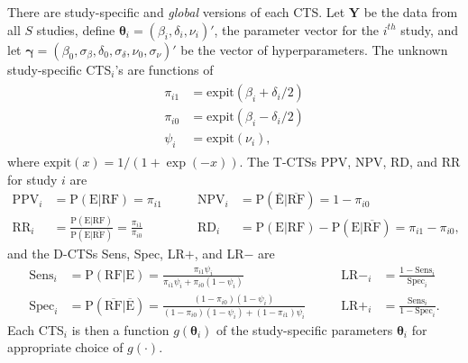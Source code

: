 \documentclass[AMA,STIX1COL]{WileyNJD-v2}
\newcommand{\E}{\mbox{E}}
\newcommand{\RF}{\mbox{RF}}
\newcommand{\Ebar}{\overline{\mbox{E}}}
\newcommand{\RFbar}{\overline{\mbox{RF}}}
\newcommand{\boldtheta}{\boldsymbol{\theta}}
\newcommand{\boldgamma}{\boldsymbol{\gamma}}
\begin{document}
There are study-specific and \textit{global} versions of each CTS. Let $\boldsymbol{Y}$ be the data from all $S$ studies, define $\boldtheta_i = (\beta_i, \delta_i, \nu_i)'$, the parameter vector for the $i^{th}$ study, and let $\boldgamma = (\beta_0, \sigma_{\beta}, \delta_0, \sigma_{\delta},\nu_0, \sigma_{\nu})'$ be the vector of hyperparameters. The unknown study-specific CTS$_i$'s are functions of
\begin{align}
\begin{split}
\pi_{i1} &= \mbox{expit}(\beta_i + \delta_i / 2)  \\
\pi_{i0} &= \mbox{expit}(\beta_i - \delta_i / 2)  \\
\psi_i &= \mbox{expit}(\nu_i), 
\end{split} \label{eq:expit}
\end{align}
where $\mbox{expit}(x) = 1 / (1 + \exp(-x))$. The T-CTSs PPV, NPV, RD, and RR for study $i$ are
\begin{equation}
\begin{alignedat}{2}
\mbox{PPV}_i &= \mbox{P}(\E \vert \RF) = \pi_{i1}   \qquad &\mbox{NPV}_i &= \mbox{P}(\Ebar \vert \RFbar) = 1 - \pi_{i0} \label{eq:rowCTS} \\
\mbox{RR}_i &= \frac{\mbox{P}(\E \vert \RF)}{\mbox{P}(\E \vert \RFbar)} = \frac{\pi_{i1}}{\pi_{i0}}  \qquad &\mbox{RD}_i &= \mbox{P}(\E \vert \RF) - \mbox{P}(\E \vert \RFbar) = \pi_{i1} - \pi_{i0} , 
\end{alignedat}
\end{equation}
\noindent and the D-CTSs Sens, Spec, LR$+$, and LR$-$ are
\begin{equation}
\begin{alignedat}{2}
\mbox{Sens}_i &= \mbox{P}(\RF \vert \E) = \frac{\pi_{i1} \psi_i}{\pi_{i1}\psi_i + \pi_{i0}(1 - \psi_i)} \qquad &  \mbox{LR}-_i &= \frac{1 - \mbox{Sens}_i}{\mbox{Spec}_i}  \label{eq:columnCTS} \\
\mbox{Spec}_i &= \mbox{P}(\RFbar \vert \Ebar) = \frac{(1 - \pi_{i0})(1 - \psi_i)}{(1 - \pi_{i0}) (1 - \psi_i) + (1 - \pi_{i1}) \psi_i} \qquad & \mbox{LR}+_i &= \frac{\mbox{Sens}_i}{1 - \mbox{Spec}_i}.
\end{alignedat}
\end{equation}
\noindent Each CTS$_i$ is then a function $g(\boldtheta_i)$ of the study-specific parameters $\boldtheta_i$ for appropriate choice of $g(\cdot)$. 
\end{document}
